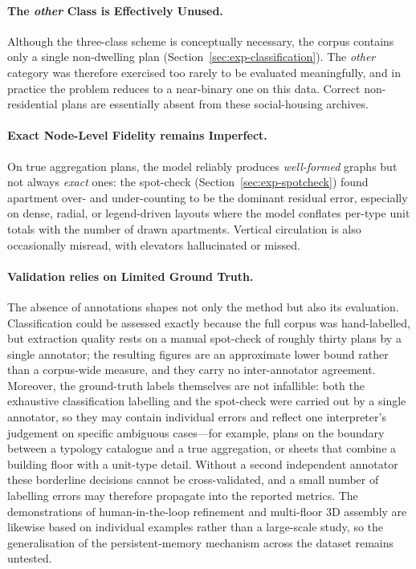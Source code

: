 \documentclass[12pt,a4paper,openright]{report}
\begin{document}
\paragraph{The \textit{other} Class is Effectively Unused.} Although the three-class scheme is conceptually necessary, the corpus contains only a single non-dwelling plan (Section~\ref{sec:exp-classification}). The \textit{other} category was therefore exercised too rarely to be evaluated meaningfully, and in practice the problem reduces to a near-binary one on this data. Correct non-residential plans are essentially absent from these social-housing archives.

\paragraph{Exact Node-Level Fidelity remains Imperfect.} On true aggregation plans, the model reliably produces \emph{well-formed} graphs but not always \emph{exact} ones: the spot-check (Section~\ref{sec:exp-spotcheck}) found apartment over- and under-counting to be the dominant residual error, especially on dense, radial, or legend-driven layouts where the model conflates per-type
unit totals with the number of drawn apartments. Vertical circulation is also occasionally misread, with elevators hallucinated or missed.

\paragraph{Validation relies on Limited Ground Truth.} The absence of
annotations shapes not only the method but also its evaluation. Classification could be assessed exactly because the full corpus was hand-labelled, but extraction quality rests on a manual spot-check of roughly thirty plans by a single annotator; the resulting figures are an approximate lower bound rather than a corpus-wide measure, and they carry no inter-annotator agreement. Moreover, the ground-truth labels themselves are not infallible: both the exhaustive classification labelling and the spot-check were carried out by a
single annotator, so they may contain individual errors and reflect one interpreter's judgement on specific ambiguous cases---for example, plans on the boundary between a typology catalogue and a true aggregation, or sheets that combine a building floor with a unit-type detail. Without a second independent annotator these borderline decisions cannot be cross-validated, and a small number of labelling errors may therefore propagate into the reported metrics. The demonstrations of human-in-the-loop refinement and multi-floor 3D assembly are likewise based on individual examples rather than a large-scale study, so the generalisation of the persistent-memory mechanism across the dataset remains untested.
\end{document}
